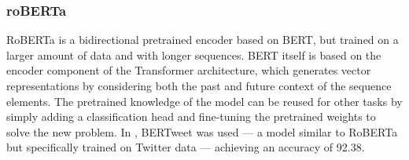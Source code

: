 \subsubsection{roBERTa}
RoBERTa is a bidirectional pretrained encoder based on BERT, but trained on a larger amount of data and with longer sequences. BERT itself is based on the encoder component of the Transformer architecture, which generates vector representations by considering both the past and future context of the sequence elements. The pretrained knowledge of the model can be reused for other tasks by simply adding a classification head and fine-tuning the pretrained weights to solve the new problem. In \cite{bonetti2023comparison}, BERTweet was used — a model similar to RoBERTa but specifically trained on Twitter data — achieving an accuracy of 92.38.